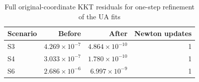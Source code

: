 \begin{table}[htbp]
\centering\small
\caption{Full original-coordinate KKT residuals for one-step refinement of the UA fits}
\label{tab:polish-results}
\begin{tabular}{@{}lrrr@{}}
\toprule
Scenario & Before & After & Newton updates \\
\midrule
S3 & $4.269\times10^{-7}$ & $4.864\times10^{-10}$ & 1 \\
S4 & $3.033\times10^{-7}$ & $1.780\times10^{-10}$ & 1 \\
S6 & $2.686\times10^{-6}$ & $6.997\times10^{-9}$ & 1 \\
\bottomrule
\end{tabular}
\end{table}
